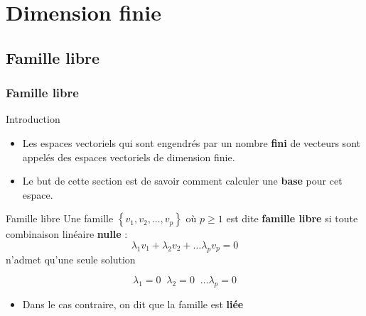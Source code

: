 \documentclass[dvipsnames]{beamer}
\begin{document}
\section{Dimension finie}%
\label{sec:dimension_finie}
\subsection{Famille libre}
\begin{frame}[t]
  \frametitle{Famille libre}
  \begin{block}{Introduction}
    \small
    \begin{itemize}
      \item Les espaces vectoriels qui sont engendrés par un nombre \textbf{fini} de
    vecteurs sont appelés des espaces vectoriels de dimension finie.
  \item Le but de cette section est de savoir comment calculer une
    \textbf{\alert{base}}  pour cet espace.
    \end{itemize}
  \end{block}
  
  \begin{block}{Famille libre}
    \small
    Une famille $\left\{v_1,v_2,\ldots, v_p\right\}$ où $p\geq1$ est dite
    \textbf{\alert{famille libre}}   si toute combinaison linéaire
    \textbf{nulle} :
    \begin{equation*}
     \lambda_1 v_1 + \lambda_2 v_2 + \ldots \lambda_p v_p = 0 
    \end{equation*}
    n'admet qu'une seule solution

    \begin{equation*}
      \lambda_1= 0 \;\; \lambda_2 = 0 \;\; \ldots \lambda_p = 0
    \end{equation*}
  \end{block}
  \begin{itemize}
    \item Dans le cas contraire, on dit que la famille est \textbf{\alert{liée}} 
  \end{itemize}
\end{frame}
\end{document}
